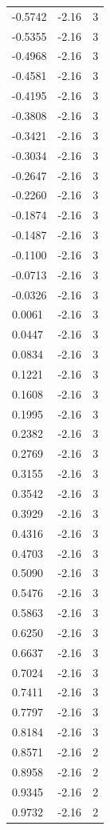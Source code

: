 \begin{longtable}{lrr}
  -0.5742 & -2.16 & 3 \\
  -0.5355 & -2.16 & 3 \\
  -0.4968 & -2.16 & 3 \\
  -0.4581 & -2.16 & 3 \\
  -0.4195 & -2.16 & 3 \\
  -0.3808 & -2.16 & 3 \\
  -0.3421 & -2.16 & 3 \\
  -0.3034 & -2.16 & 3 \\
  -0.2647 & -2.16 & 3 \\
  -0.2260 & -2.16 & 3 \\
  -0.1874 & -2.16 & 3 \\
  -0.1487 & -2.16 & 3 \\
  -0.1100 & -2.16 & 3 \\
  -0.0713 & -2.16 & 3 \\
  -0.0326 & -2.16 & 3 \\
  0.0061 & -2.16 & 3 \\
  0.0447 & -2.16 & 3 \\
  0.0834 & -2.16 & 3 \\
  0.1221 & -2.16 & 3 \\
  0.1608 & -2.16 & 3 \\
  0.1995 & -2.16 & 3 \\
  0.2382 & -2.16 & 3 \\
  0.2769 & -2.16 & 3 \\
  0.3155 & -2.16 & 3 \\
  0.3542 & -2.16 & 3 \\
  0.3929 & -2.16 & 3 \\
  0.4316 & -2.16 & 3 \\
  0.4703 & -2.16 & 3 \\
  0.5090 & -2.16 & 3 \\
  0.5476 & -2.16 & 3 \\
  0.5863 & -2.16 & 3 \\
  0.6250 & -2.16 & 3 \\
  0.6637 & -2.16 & 3 \\
  0.7024 & -2.16 & 3 \\
  0.7411 & -2.16 & 3 \\
  0.7797 & -2.16 & 3 \\
  0.8184 & -2.16 & 3 \\
  0.8571 & -2.16 & 2 \\
  0.8958 & -2.16 & 2 \\
  0.9345 & -2.16 & 2 \\
  0.9732 & -2.16 & 2 \\

\end{longtable}
